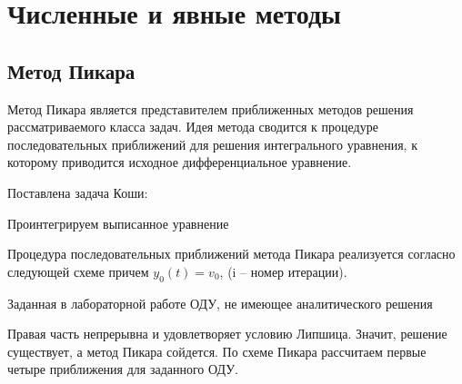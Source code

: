 \chapter{Численные и явные методы}
    
    \section{Метод Пикара}
    Метод Пикара является представителем приближенных методов решения рассматриваемого класса задач. Идея метода сводится к процедуре последовательных приближений для решения интегрального уравнения, к которому приводится исходное дифференциальное уравнение.

    Поставлена задача Коши:
    
    Проинтегрируем выписанное уравнение

    Процедура последовательных приближений метода Пикара реализуется согласно следующей схеме
    причем $y_0(t) = v_0$, (i – номер итерации).
    
    Заданная в лабораторной работе ОДУ, не имеющее аналитического решения
    
    Правая часть непрерывна и удовлетворяет условию Липшица. Значит, решение существует, а метод Пикара сойдется. По схеме Пикара рассчитаем первые четыре приближения для заданного ОДУ.
    
